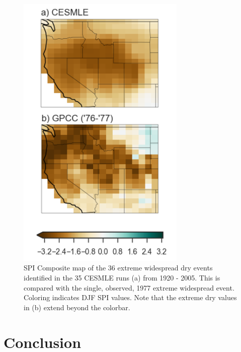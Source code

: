 \documentclass[final, double]{ua-thesis}
\begin{document}
\begin{figure}[ht]
\centering
\centerline{\includegraphics[width=19pc]{p3figures/fig_widespread_compositemaps.png}}
\caption{SPI Composite map of the 36 extreme widespread dry events identified in the 35 CESMLE runs (a) from 1920 - 2005. This is compared with the single, observed, 1977 extreme widespread event. Coloring indicates DJF SPI values. Note that the extreme dry values in (b) extend beyond the colorbar.}
\label{fig_widespread_compositemaps}
\end{figure}

\section{Conclusion}
\end{document}
